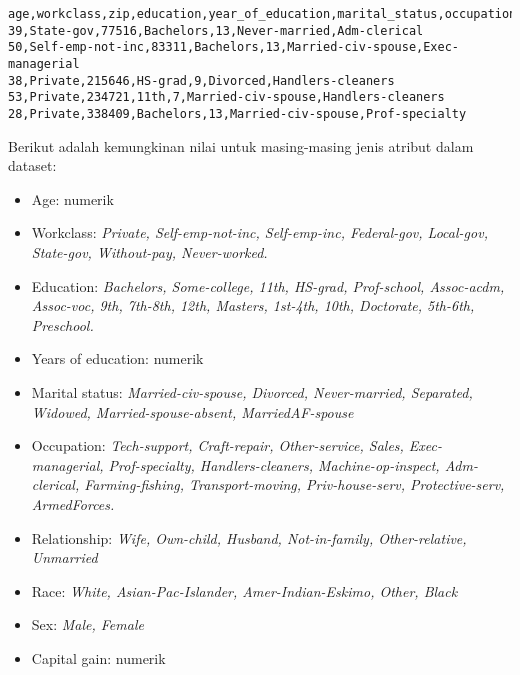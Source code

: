 \begin{lstlisting}[basicstyle=\ttfamily, frame=single,
	columns=fullflexible, keepspaces=true, breaklines=true, label=lst:lst_csv, caption=Dataset Adult]
age,workclass,zip,education,year_of_education,marital_status,occupation
39,State-gov,77516,Bachelors,13,Never-married,Adm-clerical
50,Self-emp-not-inc,83311,Bachelors,13,Married-civ-spouse,Exec-managerial
38,Private,215646,HS-grad,9,Divorced,Handlers-cleaners
53,Private,234721,11th,7,Married-civ-spouse,Handlers-cleaners
28,Private,338409,Bachelors,13,Married-civ-spouse,Prof-specialty
\end{lstlisting}

\noindent Berikut adalah kemungkinan nilai untuk masing-masing jenis atribut dalam dataset:

\begin{itemize}
\item Age: numerik

\item Workclass: \textit{Private, Self-emp-not-inc, Self-emp-inc, Federal-gov, Local-gov, State-gov, Without-pay, Never-worked.}

\item Education: \textit{Bachelors, Some-college, 11th, HS-grad, Prof-school, Assoc-acdm, Assoc-voc, 9th, 7th-8th, 12th, Masters, 1st-4th, 10th, Doctorate, 5th-6th, Preschool.}

\item Years of education: numerik

\item Marital status: 
\textit{Married-civ-spouse, Divorced, Never-married, Separated, Widowed, Married-spouse-absent, MarriedAF-spouse}

\item Occupation: \textit{Tech-support, Craft-repair, Other-service, Sales, Exec-managerial, Prof-specialty, Handlers-cleaners, Machine-op-inspect, Adm-clerical, Farming-fishing, Transport-moving, Priv-house-serv, Protective-serv, ArmedForces.}

\item Relationship: \textit{Wife, Own-child, Husband, Not-in-family, Other-relative, Unmarried}

\item Race: \textit{White, Asian-Pac-Islander, Amer-Indian-Eskimo, Other, Black}

\item Sex: \textit{Male, Female}

\item Capital gain: numerik


\end{itemize}
